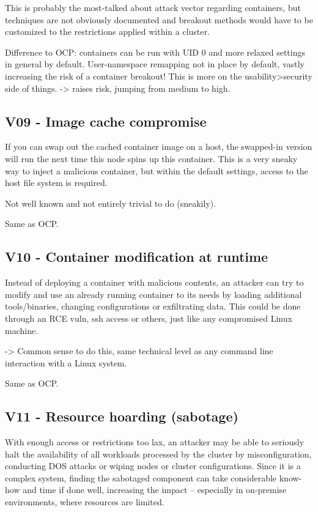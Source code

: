 This is probably the most-talked about attack vector regarding containers, but techniques are not obviously documented and breakout methods would have to be customized to the restrictions applied within a cluster.

Difference to OCP: containers can be run with UID 0 and more relaxed settings in general by default. User-namespace remapping not in place by default, vastly increasing the risk of a container breakout!
This is more on the usability>security side of things. 
-> raises risk, jumping from medium to high.


\subsection{V09 - Image cache compromise}
If you can swap out the cached container image on a host, the swapped-in version will run the next time this node spins up this container.
This is a very sneaky way to inject a malicious container, but within the default settings, access to the host file system is required.

Not well known and not entirely trivial to do (sneakily).

Same as OCP.

\subsection{V10 - Container modification at runtime}
Instead of deploying a container with malicious contents, an attacker can try to modify and use an already running container to its needs by loading additional tools/binaries, changing configurations or exfiltrating data. This could be done through an RCE vuln, ssh access or others, just like any compromised Linux machine.

-> Common sense to do this, same technical level as any command line interaction with a Linux system.

Same as OCP.

\subsection{V11 - Resource hoarding (sabotage)}
With enough access or restrictions too lax, an attacker may be able to seriously halt the availability of all workloads processed by the cluster by misconfiguration, conducting DOS attacks or wiping nodes or cluster configurations. Since it is a complex system, finding the sabotaged component can take considerable know-how and time if done well, increasing the impact – especially in on-premise environments, where resources are limited.

